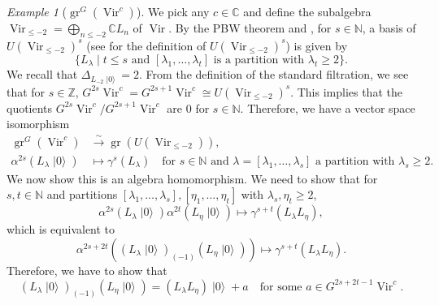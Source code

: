 \documentclass[a4paper, 12pt, reqno]{amsart}
\theoremstyle{remark}
\newtheorem{example}[theorem]{Example}
\DeclareMathOperator{\Vir}{Vir}
\DeclareMathOperator{\gr}{gr}
\DeclareMathOperator{\vac}{|0\rangle}
\begin{document}
\begin{example}[$\gr^G(\Vir^c)$]
  \label{exa:14}
  We pick any $c \in \mathbb{C}$ and define the subalgebra $\Vir_{\le -2} = \bigoplus_{n \le -2}\mathbb{C}L_{n}$ of $\Vir$.
  By the PBW theorem and , for $s \in \mathbb{N}$, a basis of $U(\Vir_{\le -2})^s$ (see  for the definition of $U(\Vir_{\le -2})^s$) is given by
  \begin{equation*}
    \{L_{\lambda} \mid \text{$t \le s$ and $[\lambda_1, \dots, \lambda_t]$ is a partition with $\lambda_t \ge 2$}\}.
  \end{equation*}
  We recall that $\Delta_{L_{-2}\vac} = 2$.
  From the definition of the standard filtration, we see that for $s \in \mathbb{Z}$, $G^{2s}\Vir^c = G^{2s + 1}\Vir^c \cong U(\Vir_{\le -2})^s$.
  This implies that the quotients $G^{2s}\Vir^c/G^{2s + 1}\Vir^c$ are $0$ for $s \in \mathbb{N}$.
  Therefore, we have a vector space isomorphism
  \begin{align*}
    \gr^G(\Vir^c) &\xrightarrow{\sim} \gr(U(\Vir_{\le -2})), \\
    \alpha^{2s}(L_{\lambda}\vac) &\mapsto \gamma^s(L_{\lambda}) \quad \text{for $s \in \mathbb{N}$ and $\lambda = [\lambda_1, \dots, \lambda_s]$ a partition with $\lambda_s \ge 2$}.
  \end{align*}
  We now show this is an algebra homomorphism.
  We need to show that for $s, t \in \mathbb{N}$ and partitions $[\lambda_1, \dots, \lambda_s], [\eta_1, \dots, \eta_t]$ with $\lambda_s, \eta_t \ge 2$,
  \begin{equation*}
    \alpha^{2s}(L_{\lambda}\vac)\alpha^{2t}(L_{\eta}\vac) \mapsto \gamma^{s + t}(L_{\lambda}L_{\eta}),
  \end{equation*}
  which is equivalent to
  \begin{equation*}
    \alpha^{2s + 2t}((L_{\lambda}\vac)_{(-1)}(L_{\eta}\vac)) \mapsto \gamma^{s + t}(L_{\lambda}L_{\eta}).
  \end{equation*}
  Therefore, we have to show that
  \begin{equation}
    \label{eq:43}
    (L_{\lambda}\vac)_{(-1)}(L_{\eta}\vac) = (L_{\lambda}L_{\eta})\vac + a \quad \text{for some $a \in G^{2s + 2t - 1}\Vir^c$}.
  \end{equation}


\end{example}
\end{document}
